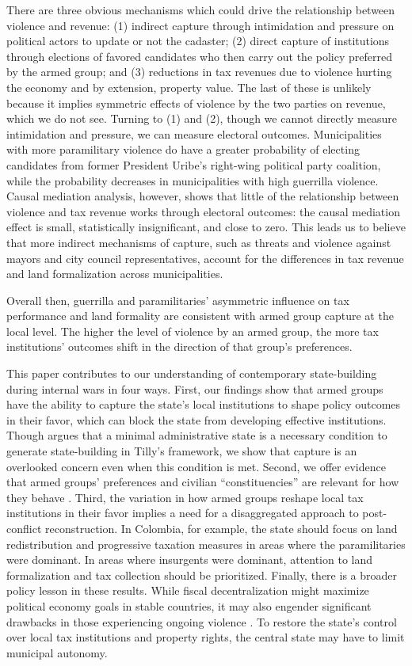 There are three obvious mechanisms which could drive the relationship between violence and revenue: (1) indirect capture through intimidation and pressure on political actors to update or not the cadaster; (2) direct capture of institutions through elections of favored candidates who then carry out the policy preferred by the armed group; and (3) reductions in tax revenues due to violence hurting the economy and by extension, property value. The last of these is unlikely because it implies symmetric effects of violence by the two parties on revenue, which we do not see. Turning to (1) and (2), though we cannot directly measure intimidation and pressure, we can measure electoral outcomes. Municipalities with more paramilitary violence do have a greater probability of electing candidates from former President Uribe's right-wing political party coalition, while the probability decreases in municipalities with high guerrilla violence. Causal mediation analysis, however, shows that little of the relationship between violence and tax revenue works through electoral outcomes: the causal mediation effect is small, statistically insignificant, and close to zero. This leads us to believe that more indirect mechanisms of capture, such as threats and violence against mayors and city council representatives, account for the differences in tax revenue and land formalization across municipalities. 

Overall then, guerrilla and paramilitaries' asymmetric influence on tax performance and land formality are consistent with armed group capture at the local level. The higher the level of violence by an armed group, the more tax institutions' outcomes shift in the direction of that group's preferences.

This paper contributes to our understanding of contemporary state-building during internal wars in four ways. First, our findings show that armed groups have the ability to capture the state's local institutions to shape policy outcomes in their favor, which can block the state from developing effective institutions. Though \citet{centeno03a} argues that a minimal administrative state is a necessary condition to generate state-building in Tilly's framework, we show that capture is an overlooked concern even when this condition is met. Second, we offer evidence that armed groups' preferences and civilian ``constituencies'' are relevant for how they behave \citep{wood03a, gutierrez-sanin03a}. Third, the variation in how armed groups reshape local tax institutions in their favor implies a need for a disaggregated approach to post-conflict reconstruction. In Colombia, for example, the state should focus on land redistribution and progressive taxation measures in areas where the paramilitaries were dominant. In areas where insurgents were dominant, attention to land formalization and tax collection should be prioritized. Finally, there is a broader policy lesson in these results. While fiscal decentralization might maximize political economy goals in stable countries, it may also engender significant drawbacks in those experiencing ongoing violence \citep{steeleschubiger15a, eaton06a}. To restore the state's control over local tax institutions and property rights, the central state may have to limit municipal autonomy. 
 
